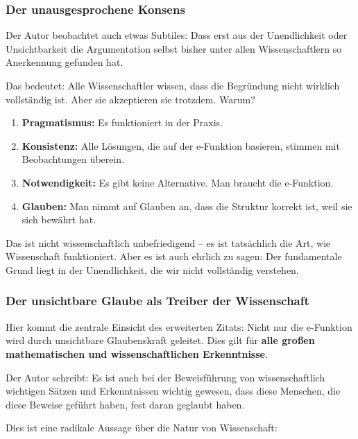 \documentclass[a4paper,12pt,twoside]{report}
\theoremstyle{definition}
\begin{document}
\subsubsection*{Der unausgesprochene Konsens}

Der Autor beobachtet auch etwas Subtiles: Dass erst aus der Unendlichkeit oder Unsichtbarkeit die Argumentation selbst bisher unter allen Wissenschaftlern so Anerkennung gefunden hat.

Das bedeutet: Alle Wissenschaftler wissen, dass die Begründung nicht wirklich vollständig ist. Aber sie akzeptieren sie trotzdem. Warum?

\begin{enumerate}
	\item \textbf{Pragmatismus:} Es funktioniert in der Praxis.
	
	\item \textbf{Konsistenz:} Alle Lösungen, die auf der e-Funktion basieren, stimmen mit Beobachtungen überein.
	
	\item \textbf{Notwendigkeit:} Es gibt keine Alternative. Man braucht die e-Funktion.
	
	\item \textbf{Glauben:} Man nimmt auf Glauben an, dass die Struktur korrekt ist, weil sie sich bewährt hat.
\end{enumerate}

Das ist nicht wissenschaftlich unbefriedigend -- es ist tatsächlich die Art, wie Wissenschaft funktioniert. Aber es ist auch ehrlich zu sagen: Der fundamentale Grund liegt in der Unendlichkeit, die wir nicht vollständig verstehen.

\subsubsection*{Der unsichtbare Glaube als Treiber der Wissenschaft}

Hier kommt die zentrale Einsicht des erweiterten Zitats: Nicht nur die e-Funktion wird durch unsichtbare Glaubenskraft geleitet. Dies gilt für \textbf{alle großen mathematischen und wissenschaftlichen Erkenntnisse}.

Der Autor schreibt: Es ist auch bei der Beweisführung von wissenschaftlich wichtigen Sätzen und Erkenntnissen wichtig gewesen, dass diese Menschen, die diese Beweise geführt haben, fest daran geglaubt haben.

Dies ist eine radikale Aussage über die Natur von Wissenschaft:
\end{document}
